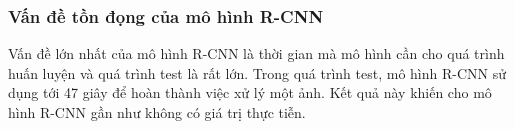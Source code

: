 {    \subsubsection{Vấn đề tồn đọng của mô hình R-CNN}
    Vấn đề lớn nhất của mô hình R-CNN là thời gian mà mô hình cần cho quá trình huấn luyện và quá trình test là rất lớn.
    Trong quá trình test, mô hình R-CNN sử dụng tới 47 giây để hoàn thành việc xử lý một ảnh.
    Kết quả này khiến cho mô hình R-CNN gần như không có giá trị thực tiễn.
}
